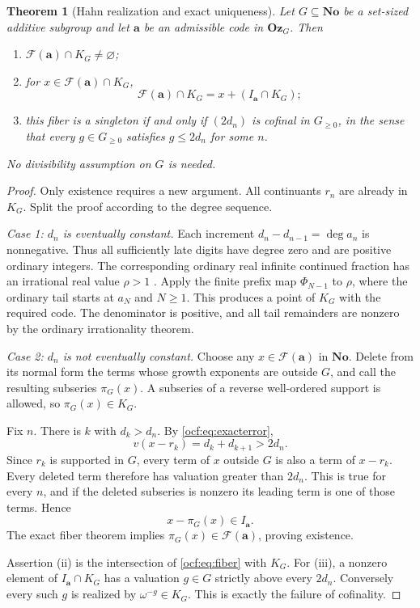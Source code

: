 \documentclass[11pt,a4paper]{article}
\numberwithin{equation}{section}
\newtheorem{theorem}{Theorem}[section]
\theoremstyle{definition}
\theoremstyle{remark}
\newcommand{\No}{\mathbf{No}}
\newcommand{\Oz}{\mathbf{Oz}}
\newcommand{\F}{\mathcal F}
\newcommand{\dgr}{\operatorname{deg}}
\newcommand{\codea}{\boldsymbol a}
\begin{document}
\begin{theorem}[Hahn realization and exact uniqueness]\label{ocf:thm:hahn}
Let $G\subseteq\No$ be a set-sized additive subgroup and let $\codea$ be
an admissible code in $\Oz_G$. Then
\begin{enumerate}[label=\textup{(\roman*)}]
\item $\F(\codea)\cap K_G\ne\varnothing$;
\item for $x\in\F(\codea)\cap K_G$,
\[
 \F(\codea)\cap K_G=x+(I_{\codea}\cap K_G);
\]
\item this fiber is a singleton if and only if $(2d_n)$ is cofinal in
$G_{\ge0}$, in the sense that every $g\in G_{\ge0}$ satisfies
$g\le2d_n$ for some $n$.
\end{enumerate}
No divisibility assumption on $G$ is needed.
\end{theorem}
\begin{proof}
Only existence requires a new argument. All continuants $r_n$ are already
in $K_G$. Split the proof according to the degree sequence.

\emph{Case 1: $d_n$ is eventually constant.} Each increment
$d_n-d_{n-1}=\dgr a_n$ is nonnegative. Thus all sufficiently late digits
have degree zero and are positive ordinary integers. The corresponding
ordinary real infinite continued fraction has an irrational real value
$\rho>1$ \cite{Krishnan}. Apply the finite prefix map $\Phi_{N-1}$ to
$\rho$, where the ordinary tail starts at $a_N$ and $N\ge1$. This produces
a point of $K_G$ with the required code. The denominator is positive, and
all tail remainders are nonzero by the ordinary irrationality theorem.

\emph{Case 2: $d_n$ is not eventually constant.} Choose any
$x\in\F(\codea)$ in $\No$. Delete from its normal form the terms whose
growth exponents are outside $G$, and call the resulting subseries
$\pi_G(x)$. A subseries of a reverse well-ordered support is allowed, so
$\pi_G(x)\in K_G$.

Fix $n$. There is $k$ with $d_k>d_n$. By \eqref{ocf:eq:exacterror},
\[
 v(x-r_k)=d_k+d_{k+1}>2d_n.
\]
Since $r_k$ is supported in $G$, every term of $x$ outside $G$ is also a
term of $x-r_k$. Every deleted term therefore has valuation greater than
$2d_n$. This is true for every $n$, and if the deleted subseries is nonzero
its leading term is one of those terms. Hence
\[
 x-\pi_G(x)\in I_{\codea}.
\]
The exact fiber theorem implies $\pi_G(x)\in\F(\codea)$, proving existence.

Assertion (ii) is the intersection of \eqref{ocf:eq:fiber} with $K_G$.
For (iii), a nonzero element of $I_{\codea}\cap K_G$ has a valuation
$g\in G$ strictly above every $2d_n$. Conversely every such $g$ is realized
by $\omega^{-g}\in K_G$. This is exactly the failure of cofinality.
\end{proof}
\end{document}
